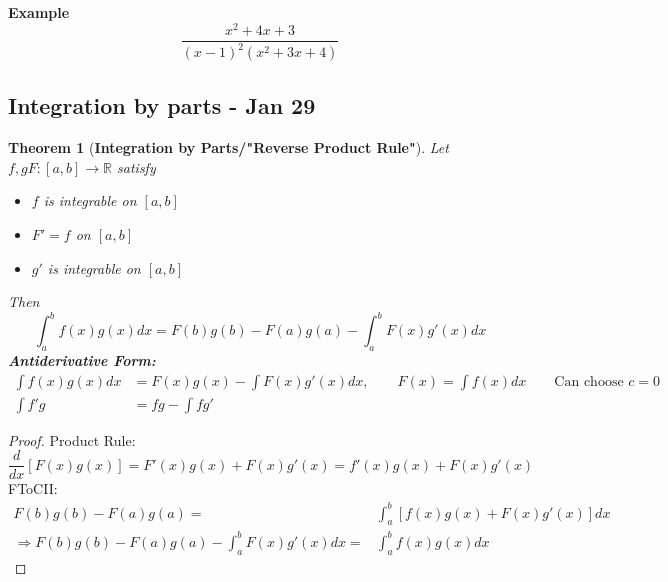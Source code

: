 \documentclass[12pt]{article}
\theoremstyle{plain}
\newtheorem{theorem}{Theorem}[subsection]
\newcommand{\mR}{{\mathbb{R}}}
\begin{document}
	{\color{Brown}
	\textbf{Example}
	\[
		\frac{x^2 + 4x+3}{(x-1)^2(x^2+3x+4)} 
	\]
	}

	\newpage
	\subsection{Integration by parts - Jan 29}
	\begin{theorem}[\textbf{Integration by Parts/"Reverse Product Rule"}]
		Let $f, g F:[a,b] \to \mR$ satisfy
		\begin{itemize}
			\item $f$ is integrable on $[a,b]$
			\item $F' = f$ on $[a,b]$
			\item $g'$ is integrable on $[a,b]$
		\end{itemize}
		Then 
		\[
			\int_a^b f(x)g(x)dx = F(b)g(b) - F(a)g(a) - \int_a^b F(x)g'(x)dx
		\]
		\textbf{Antiderivative Form: }
		\begin{align*}
			\int f(x)g(x)dx &= F(x)g(x) - \int F(x)g'(x)dx, \qquad 
				F(x) = \int f(x)dx \qquad \text{Can choose $c=0$}\\
			\int f'g &= fg-\int fg'
		\end{align*}
	\end{theorem}
	\begin{proof}
		Product Rule: 
		\[
			\frac{d}{dx} [F(x)g(x)] = F'(x)g(x) + F(x)g'(x)
			=f'(x)g(x) + F(x)g'(x)
		\]
		FToCII:
		\begin{align*}
			F(b)g(b) - F(a)g(a)
			=& \int_a^b [f(x)g(x) + F(x)g'(x)] dx\\
			\Rightarrow F(b)g(b) - F(a)g(a) - \int_a^b F(x)g'(x)dx
			=&\int_a^b f(x)g(x)dx
		\end{align*}
	\end{proof}
\end{document}
